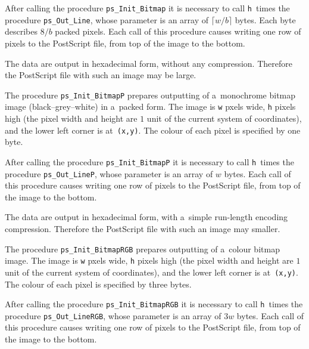 After calling the procedure \texttt{ps\_Init\_Bitmap} it is necessary to call
\texttt{h}~times the procedure \texttt{ps\_Out\_Line}, whose parameter is
an array of $\lceil w/b\rceil$ bytes. Each byte describes $8/b$ packed pixels.
Each call of this procedure causes writing one row of pixels to the
PostScript file, from top of the image to the bottom.

The data are output in hexadecimal form, without any compression.
Therefore the PostScript file with such an image may be large.

\vspace{\bigskipamount}
The procedure \texttt{ps\_Init\_BitmapP} prepares outputting of a~monochrome
bitmap image (black--grey--white) in a~packed form. The image is
\texttt{w} pxels wide,
\texttt{h} pixels high (the pixel width and height are $1$ unit
of the current system of coordinates), and the lower left corner
is at~\texttt{(x,y)}. The colour of each pixel is specified by one byte.

After calling the procedure \texttt{ps\_Init\_BitmapP} it is necessary to call
\texttt{h}~times the procedure \texttt{ps\_Out\_LineP}, whose parameter is
an array of $w$ bytes.
Each call of this procedure causes writing one row of pixels to the
PostScript file, from top of the image to the bottom.

The data are output in hexadecimal form, with a~simple run-length encoding
compression. Therefore the PostScript file with such an image may smaller.

\vspace{\bigskipamount}
The procedure \texttt{ps\_Init\_BitmapRGB} prepares outputting of a~colour
bitmap image. The image is \texttt{w} pxels wide,
\texttt{h} pixels high (the pixel width and height are $1$ unit
of the current system of coordinates), and the lower left corner
is at~\texttt{(x,y)}. The colour of each pixel is specified by three bytes.

After calling the procedure \texttt{ps\_Init\_BitmapRGB} it is necessary to call
\texttt{h}~times the procedure \texttt{ps\_Out\_LineRGB}, whose parameter is
an array of $3w$ bytes.
Each call of this procedure causes writing one row of pixels to the
PostScript file, from top of the image to the bottom.

